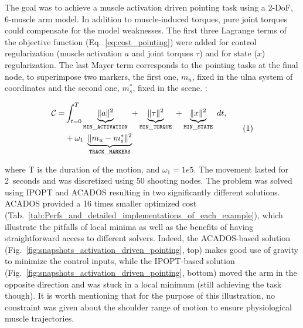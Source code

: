 The goal was to achieve a muscle activation driven pointing task using a 2-DoF, 6-muscle arm model. 
In addition to muscle-induced torques, pure joint torques could compensate for the model weaknesses.
The first three Lagrange terms of the objective function (Eq.~\ref{eq:cost_pointing}) were added for control regularization (muscle activation $a$ and joint torques $\tau$) and for state ($x$) regularization.
The last Mayer term corresponds to the pointing tasks at the final node, to superimpose two markers, the first one, $m_u$, fixed in the ulna system of coordinates and the second one, $m^*_s$, fixed in the scene.
:

\[
\begin{aligned}
	\mathcal{C} = &\int_{t=0}^T\underbrace{\|a\|^2}_{\mathtt{MIN\_ACTIVATION}}~
	+\underbrace{\|\tau\|^2}_{\mathtt{MIN\_TORQUE}}~
	+\underbrace{\|x\|^2}_{\mathtt{MIN\_STATE}}~ dt,\\
	&+ \omega_1~\underbrace{\|m_u-m^*_s\|^2}_{\mathtt{TRACK\_MARKERS}}~
\end{aligned}
\addtag
\label{eq:cost_pointing}
\]
%

\noindent where T is the duration of the motion, and $\omega_1=1e5$.
The movement lasted for 2~seconds and was discretized using 50 shooting nodes.
The problem was solved using IPOPT and ACADOS resulting in two significantly different solutions.
ACADOS provided a 16 times smaller optimized cost (Tab.~\ref{tab:Perfs_and_detailed_implementations_of_each_example}), which illustrate the pitfalls of local minima as well as the benefits of having straightforward access to different solvers.  
Indeed, the ACADOS-based solution (Fig.~\ref{fig:snapshots_activation_driven_pointing}, top) makes good use of gravity to minimize the control inputs, while the IPOPT-based solution (Fig.~\ref{fig:snapshots_activation_driven_pointing}, bottom) moved the arm in the opposite direction and was stuck in a local minimum (still achieving the task though). 
It is worth mentioning that for the purpose of this illustration, no constraint was given about the shoulder range of motion to ensure physiological muscle trajectories. 

 
 

